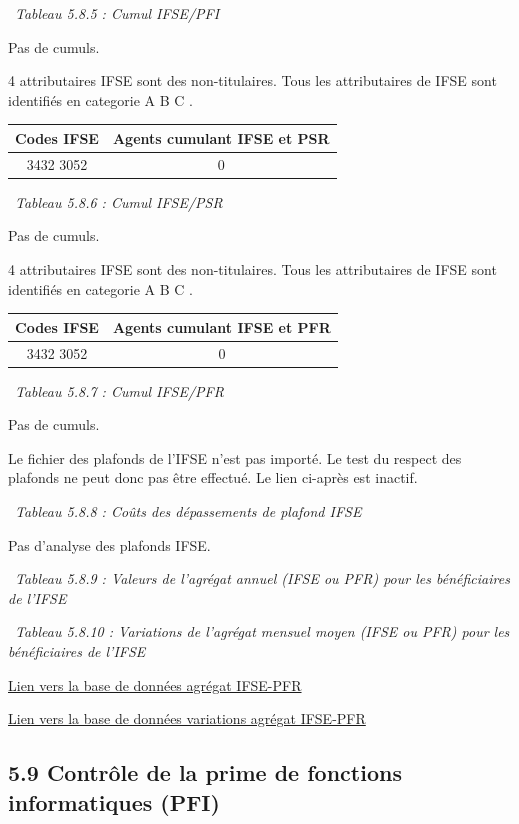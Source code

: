 ~\emph{Tableau 5.8.5 : Cumul IFSE/PFI}

Pas de cumuls.

4 attributaires IFSE sont des non-titulaires. Tous les attributaires de
IFSE sont identifiés en categorie A B C .

\begin{longtable}[]{@{}cc@{}}
\toprule
Codes IFSE & Agents cumulant IFSE et PSR\tabularnewline
\midrule
\endhead
3432 3052 & 0\tabularnewline
\bottomrule
\end{longtable}

~\emph{Tableau 5.8.6 : Cumul IFSE/PSR}

Pas de cumuls.

4 attributaires IFSE sont des non-titulaires. Tous les attributaires de
IFSE sont identifiés en categorie A B C .

\begin{longtable}[]{@{}cc@{}}
\toprule
Codes IFSE & Agents cumulant IFSE et PFR\tabularnewline
\midrule
\endhead
3432 3052 & 0\tabularnewline
\bottomrule
\end{longtable}

~\emph{Tableau 5.8.7 : Cumul IFSE/PFR}

Pas de cumuls.

Le fichier des plafonds de l'IFSE n'est pas importé. Le test du respect
des plafonds ne peut donc pas être effectué. Le lien ci-après est
inactif.

~\emph{Tableau 5.8.8 : Coûts des dépassements de plafond IFSE}

Pas d'analyse des plafonds IFSE.

~\emph{Tableau 5.8.9 : Valeurs de l'agrégat annuel (IFSE ou PFR) pour
les bénéficiaires de l'IFSE}

~\emph{Tableau 5.8.10 : Variations de l'agrégat mensuel moyen (IFSE ou
PFR) pour les bénéficiaires de l'IFSE}

\href{../Bases/Remunerations/beneficiaires.IFSE.PFR.csv}{Lien vers la base
de données agrégat IFSE-PFR}

\href{../Bases/Remunerations/beneficiaires.IFSE.PFR.Variation.csv}{Lien
vers la base de données variations agrégat IFSE-PFR}

\hypertarget{controle-de-la-prime-de-fonctions-informatiques-pfi}{%
\subsection{5.9 Contrôle de la prime de fonctions informatiques
(PFI)}\label{controle-de-la-prime-de-fonctions-informatiques-pfi}}

